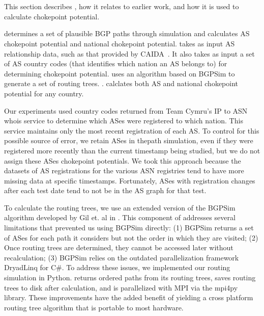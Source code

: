 
\section{\toolname}

This section describes \toolname{}, how it relates to earlier work, and how it is used to calculate chokepoint
potential.

\toolname{} determines a set of plausible BGP paths through simulation and calculates AS
chokepoint potential and national chokepoint potential.  \toolname{} takes as input AS relationship data, such as that provided by
CAIDA~\cite{CAIDA}.  It also takes as input a set of AS
country codes (that identifies which nation an AS belongs to) for
determining chokepoint potential.  \toolname{}
uses an algorithm based on BGPSim \cite{quicksand} to
generate a set of routing trees. . \toolname{} 
calclates both AS and national chokepoint potential for any country.

Our experiments used country codes returned from Team Cymru's IP to
ASN whois service \cite{cymru} to determine which ASes were registered
to which nation.  This service maintains only the most recent
registration of each AS.  To control for this possible source of
error, we retain ASes in thepath simulation, even if they were
registered more recently than the current timestamp being studied, but
we do not assign these ASes chokepoint potentials. We took this approach
because the datasets of AS registrations for the various ASN
registries tend to have more missing data at specific timestamps.
Fortunately, ASes with registration changes after each test date tend
to not be in the AS graph for that test. 

\par To calculate the routing trees, we use an extended version of the
BGPSim algorithm developed by Gil et. al in \cite{quicksand}. This
component of \toolname{} addresses several limitations that prevented
us using BGPSim directly: (1) BGPSim returns a set of ASes for each
path it considers but not the order in which they are visited; (2)
Once routing trees are determined, they cannot be accessed later
without recalculation; (3) BGPSim relies on the outdated
parallelization framework DryadLinq for C\#. To address these issues,
we implemented our routing simulation in
Python. \toolname{} returns
ordered paths from its routing trees, saves routing trees to disk
after calculation, and is parallelized with MPI via the mpi4py
library. These improvements have the added benefit of yielding a cross
platform routing tree algorithm that is portable to most
hardware.

